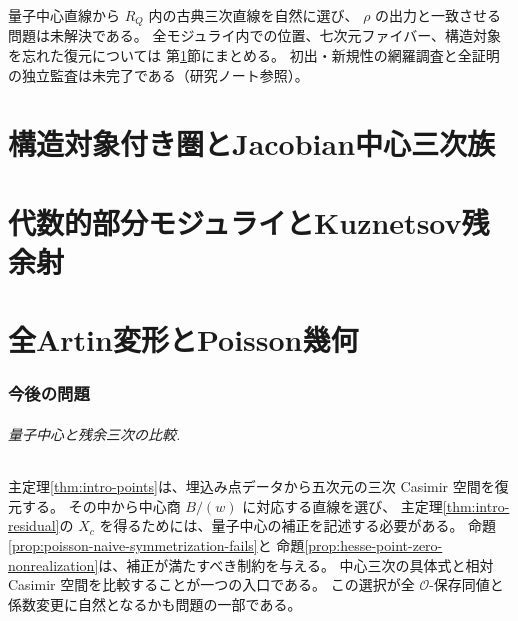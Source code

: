 \documentclass[11pt,a4paper]{ltjsarticle}
\numberwithin{equation}{section}
\begin{document}
量子中心直線から $R_Q$ 内の古典三次直線を自然に選び、
$\rho$ の出力と一致させる問題は未解決である。
全モジュライ内での位置、七次元ファイバー、構造対象を忘れた復元については
第\ref{sec:status}節にまとめる。
初出・新規性の網羅調査と全証明の独立監査は未完了である（研究ノート参照）。

\clearpage
\part{構造対象付き圏とJacobian中心三次族}










\clearpage
\part{代数的部分モジュライとKuznetsov残余射}






\clearpage
\part{全Artin変形とPoisson幾何}







\section{今後の問題}\label{sec:status}

\paragraph{量子中心と残余三次の比較.}
主定理\ref{thm:intro-points}は、埋込み点データから五次元の三次 Casimir 空間を復元する。
その中から中心商 $B/(w)$ に対応する直線を選び、
主定理\ref{thm:intro-residual}の $X_c$ を得るためには、量子中心の補正を記述する必要がある。
命題\ref{prop:poisson-naive-symmetrization-fails}と
命題\ref{prop:hesse-point-zero-nonrealization}は、補正が満たすべき制約を与える。
中心三次の具体式と相対 Casimir 空間を比較することが一つの入口である。
この選択が全 $\mathcal O$-保存同値と係数変更に自然となるかも問題の一部である。
\end{document}
